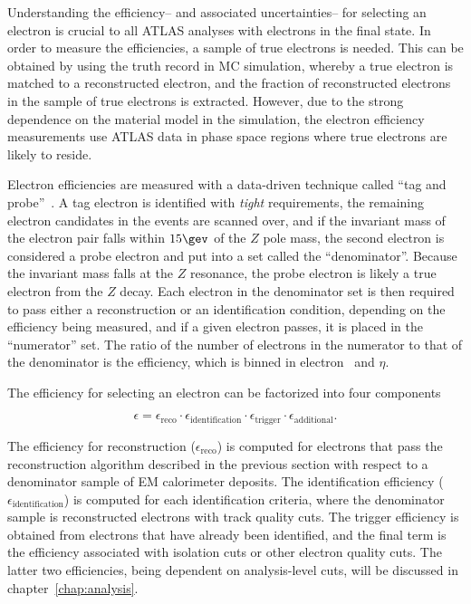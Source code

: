 %  

Understanding the efficiency-- and associated uncertainties-- for
selecting an electron is crucial to all ATLAS analyses with electrons
in the final state. In order to measure the efficiencies, a sample of
true electrons is needed. This can be obtained by using the truth
record in MC simulation, whereby a true electron is matched to a
reconstructed electron, and the fraction of reconstructed electrons in
the sample of true electrons is extracted. However, due to the strong dependence on the
material model in the simulation, the electron efficiency measurements
use ATLAS data in phase space regions where true electrons are
likely to reside. 

Electron efficiencies are measured with a data-driven technique called
``tag and probe''~\cite{bib:ATLAS-CONF-2014-032}. A tag electron is identified with {\it tight}
requirements, the remaining electron candidates in the events are
scanned over, and if the invariant mass of the electron pair falls
within $15 \gev$ of the $Z$ pole mass, the second electron is
considered a probe electron and put into a set called the
``denominator''. Because the invariant mass falls at the
$Z$ resonance, the probe electron is likely a true electron from the
$Z$ decay. Each electron in the denominator set is then required to
pass either a reconstruction or an identification condition, depending
on the efficiency being measured, and if a given electron passes, it
is placed in the ``numerator'' set. The ratio of the number of
electrons in the numerator to that of the denominator is the
efficiency, which is binned in electron \et~and $\eta$. 

The efficiency for selecting an electron can be factorized into four
components

\begin{equation}
\epsilon =
\epsilon_{\textrm{reco}}\cdot\epsilon_{\textrm{identification}}\cdot\epsilon_{\textrm{trigger}}\cdot\epsilon_{\textrm{additional}}.
\end{equation}

\noindent
The efficiency for reconstruction ($\epsilon_{\textrm{reco}}$) is
computed for electrons that pass the reconstruction algorithm
described in the previous section with respect to a denominator sample of EM
calorimeter deposits. The identification efficiency
($\epsilon_{\textrm{identification}}$) is computed for each
identification criteria, where the denominator sample is reconstructed
electrons with track quality cuts. The trigger efficiency is obtained
from electrons that have already been identified, and the final term is the
efficiency associated with isolation cuts or other electron quality
cuts. The latter two efficiencies, being dependent on analysis-level
cuts, will be discussed in chapter~\ref{chap:analysis}.

